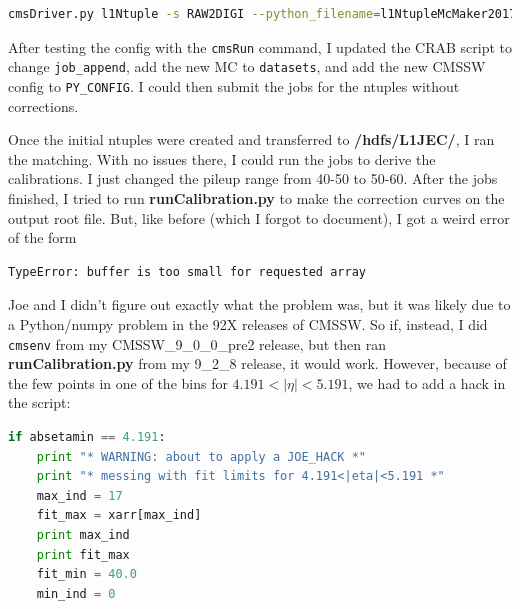 \begin{lstlisting}[belowskip=-0.7cm, language=sh, numbers=none]
cmsDriver.py l1Ntuple -s RAW2DIGI --python_filename=l1NtupleMcMaker2017_RAW2DIGI_v3.py -n 420 --no_output --era=Run2_2017 --mc --conditions=92X_upgrade2017_realistic_v7 --customise=L1Trigger/Configuration/customiseReEmul.L1TReEmulMCFrom90xRAWSimHcalTP --customise=L1Trigger/L1TNtuples/customiseL1Ntuple.L1NtupleRAWEMUGEN_MC --customise=L1Trigger/Configuration/customiseSettings.L1TSettingsToCaloStage2Params_2017_v1_10_mode_inconsistent --filein=/store/mc/RunIISummer17DRStdmix/QCD_Pt-15to3000_TuneCUETP8M1_Flat_13TeV_pythia8/GEN-SIM-RAW/NZSFlatPU28to62_92X_upgrade2017_realistic_v10-v1/10000/00052042-ED9E-E711-A959-FA163E22945C.root
\end{lstlisting}

After testing the config with the \texttt{cmsRun} command, I updated the CRAB script to change \texttt{job\_append}, add the new MC to \texttt{datasets}, and add the new CMSSW config to \texttt{PY\_CONFIG}. I could then submit the jobs for the ntuples without corrections.

Once the initial ntuples were created and transferred to \textbf{/hdfs/L1JEC/}, I ran the matching. With no issues there, I could run the jobs to derive the calibrations. I just changed the pileup range from 40-50 to 50-60. After the jobs finished, I tried to run \textbf{runCalibration.py} to make the correction curves on the output root file. But, like before (which I forgot to document), I got a weird error of the form

\begin{lstlisting}[belowskip=-0.7cm, language=sh, numbers=none]
TypeError: buffer is too small for requested array
\end{lstlisting}

Joe and I didn't figure out exactly what the problem was, but it was likely due to a Python/numpy problem in the 92X releases of CMSSW. So if, instead, I did \texttt{cmsenv} from my CMSSW\_9\_0\_0\_pre2 release, but then ran \textbf{runCalibration.py} from my 9\_2\_8 release, it would work. However, because of the few points in one of the \pt bins for $4.191 < |\eta| < 5.191$, we had to add a hack in the script:

\begin{lstlisting}[belowskip=-0.7cm, language=python, numbers=none]
if absetamin == 4.191:
    print "* WARNING: about to apply a JOE_HACK *"
    print "* messing with fit limits for 4.191<|eta|<5.191 *"
    max_ind = 17
    fit_max = xarr[max_ind]
    print max_ind
    print fit_max
    fit_min = 40.0
    min_ind = 0
\end{lstlisting}

